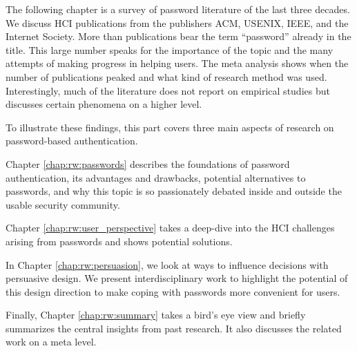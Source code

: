 \label{sec:rw:intro}


The following chapter is a survey of password literature of the last three decades. We discuss HCI publications from the publishers ACM, USENIX, IEEE, and the Internet Society. More than  publications bear the term ``password'' already in the title. This large number speaks for the importance of the topic and the many attempts of making progress in helping users. The meta analysis shows when the number of publications peaked and what kind of research method was used. Interestingly, much of the literature does not report on empirical studies but discusses certain phenomena on a higher level. 


To illustrate these findings, this part covers three main aspects of research on password-based authentication. 

Chapter \ref{chap:rw:passwords} describes the foundations of password authentication, its advantages and drawbacks, potential alternatives to passwords, and why this topic is so passionately debated inside and outside the usable security community. 

Chapter \ref{chap:rw:user_perspective} takes a deep-dive into the HCI challenges arising from passwords and shows potential solutions. 

In Chapter \ref{chap:rw:persuasion}, we look at ways to influence decisions with persuasive design. We present interdisciplinary work to highlight the potential of this design direction to make coping with passwords more convenient for users.  

Finally, Chapter \ref{chap:rw:summary} takes a bird's eye view and briefly summarizes the central insights from past research. It also discusses the related work on a meta level. 

